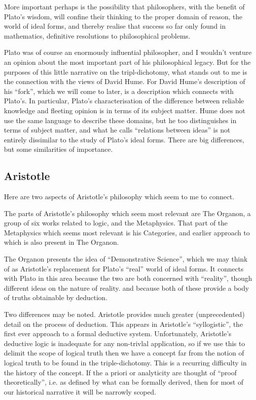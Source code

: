 \documentclass[10pt,titlepage]{article}
\begin{document}
More important perhaps is the possibility that philosophers, with the benefit of Plato's wisdom, will confine their thinking to the proper domain of reason, the world of ideal forms, and thereby realise that success so far only found in mathematics, definitive resolutions to philosophical problems.

Plato was of course an enormously influential philosopher, and I wouldn't venture an opinion about the most important part of his philosophical legacy.
But for the purposes of this little narrative on the tripl-dichotomy, what stands out to me is the connection with the views of David Hume.
For David Hume's description of his ``fork'', which we will come to later, is a description which connects with Plato's.
In particular, Plato's characterisation of the difference between reliable knowledge and fleeting opinion is in terms of its subject matter.
Hume does not use the same language to describe these domains, but he too distinguishes in terms of subject matter, and what he calls ``relations between ideas'' is not entirely dissimilar to the study of Plato's ideal forms.
There are big differences, but some similarities of importance.

\subsection{Aristotle}

Here are two aspects of Aristotle's philosophy which seem to me to connect.

The parts of Aristotle's philosophy which seem most relevant are The Organon, a group of six works related to logic, and the Metaphysics.
That part of the Metaphysics which seems most relevant is his Categories, and earlier approach to which is also present in The Organon.

The Organon presents the idea of ``Demonstrative Science'', which we may think of as Aristotle's replacement for Plato's ``real'' world of ideal forms.
It connects with Plato in this area because the two are both concerned with ``reality'', though different ideas on the nature of reality. and because both of these provide a body of truths obtainable by deduction.

Two differences may be noted.
Aristotle provides much greater (unprecedented) detail on the process of deduction.
This appears in Aristotle's ``syllogistic'', the first ever approach to a formal deductive system.
Unfortunately, Aristotle's deductive logic is inadequate for any non-trivlal application, so if we use this to delimit the scope of logical truth then we have a concept far from the notion of logical truth to be found in the triple-dichotomy.
This is a recurring difficulty in the history of the concept.
If the a priori or analyticity are thought of ``proof theoretically'', i.e. as defined by what can be formally derived, then for most of our historical narrative it will be narrowly scoped.
\end{document}
